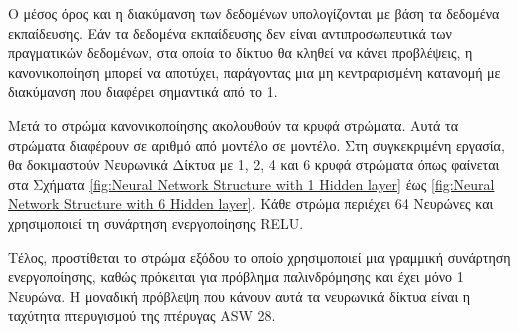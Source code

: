 Ο μέσος όρος και η διακύμανση των δεδομένων υπολογίζονται με βάση τα δεδομένα εκπαίδευσης. Εάν τα δεδομένα εκπαίδευσης δεν είναι αντιπροσωπευτικά των πραγματικών δεδομένων, στα οποία το δίκτυο θα κληθεί να κάνει προβλέψεις, η κανονικοποίηση μπορεί να αποτύχει, παράγοντας μια μη κεντραρισμένη κατανομή με διακύμανση που διαφέρει σημαντικά από το 1.

Μετά το στρώμα κανονικοποίησης ακολουθούν τα κρυφά στρώματα. Αυτά τα στρώματα διαφέρουν σε αριθμό από μοντέλο σε μοντέλο. Στη συγκεκριμένη εργασία, θα δοκιμαστούν Νευρωνικά Δίκτυα με 1, 2, 4 και 6 κρυφά στρώματα όπως φαίνεται στα Σχήματα \ref{fig:Neural Network Structure with 1 Hidden layer} έως \ref{fig:Neural Network Structure with 6 Hidden layer}. Κάθε στρώμα περιέχει 64 Νευρώνες και χρησιμοποιεί τη συνάρτηση ενεργοποίησης \textlatin{RELU}.

Τέλος, προστίθεται το στρώμα εξόδου το οποίο χρησιμοποιεί μια γραμμική συνάρτηση ενεργοποίησης, καθώς πρόκειται για πρόβλημα παλινδρόμησης και έχει μόνο 1 Νευρώνα. Η μοναδική πρόβλεψη που κάνουν αυτά τα νευρωνικά δίκτυα είναι η ταχύτητα πτερυγισμού της  πτέρυγας \textlatin{ASW 28}.


